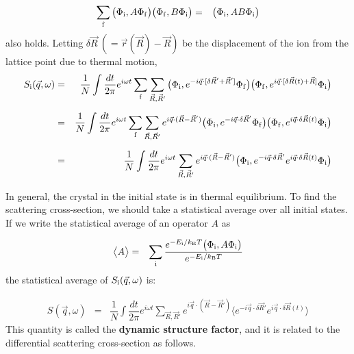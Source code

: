 \documentclass[a4j]{jsarticle}
\begin{document}
\begin{eqnarray}
	\sum_{\rm f}
	\big( \Phi_{\rm i} , A \Phi_{\rm f} \big)
	\big( \Phi_{\rm f} , B \Phi_{\rm i} \big)
	&=&
	\big( \Phi_{\rm i} , AB \Phi_{\rm i} \big)
\end{eqnarray}
also holds.
Letting $\delta \vec{R} \ (= \vec{r}(\vec{R}) - \vec{R} )$ be the displacement of the ion from the lattice point due to thermal motion,
\begin{eqnarray}
	S_{\rm i}(\vec{q},\omega)
	&=&
	\dfrac{1}{N}
	\int \dfrac{ dt }{ 2 \pi }
	e^{ i \omega t }
	\sum_{\rm f}
	\sum_{\vec{R},\vec{R}'}
	\big( \Phi_{\rm i} , e^{ - i \vec{q} \cdot [ \delta \vec{R}' + \vec{R}' ]  } \Phi_{\rm f} \big)
	\big( \Phi_{\rm f} , e^{i \vec{q} \cdot [ \delta \vec{R}(t) + \vec{R} ] } \Phi_{\rm i} \big)
	\nonumber \\[2mm] &=&
	\dfrac{1}{N}
	\int \dfrac{ dt }{ 2 \pi }
	e^{ i \omega t }
	\sum_{\rm f}
	\sum_{\vec{R},\vec{R}'}
	e^{ i \vec{q} \cdot (\vec{R} - \vec{R}')}
	\big( \Phi_{\rm i} , e^{ - i \vec{q} \cdot \delta \vec{R}' } \Phi_{\rm f} \big)
	\big( \Phi_{\rm f} , e^{i \vec{q} \cdot \delta \vec{R}(t) } \Phi_{\rm i} \big)
	\nonumber \\[2mm] &=&
	\dfrac{1}{N}
	\int \dfrac{ dt }{ 2 \pi }
	e^{ i \omega t }
	\sum_{\vec{R},\vec{R}'}
	e^{ i \vec{q} \cdot (\vec{R} - \vec{R}')}
	\big( \Phi_{\rm i} , e^{ - i \vec{q} \cdot \delta \vec{R}' } e^{i \vec{q} \cdot \delta \vec{R}(t) } \Phi_{\rm i} \big)
\end{eqnarray}

In general, the crystal in the initial state is in thermal equilibrium.
To find the scattering cross-section, we should take a statistical average over all initial states.
If we write the statistical average of an operator $A$ as

\begin{eqnarray}
	\big\langle A \big\rangle
	&=&
	\sum_{\rm i}
	\dfrac{ e^{ - E_{\rm i} / k_{\rm B} T } \big( \Phi_{\rm i} , A \Phi_{\rm i} \big) }{e^{ - E_{\rm i} / k_{\rm B} T }}
\end{eqnarray}
the statistical average of $S_{\rm i}(\vec{q},\omega)$ is:

\begin{eqnarray}
	S(\vec{q},\omega)
	&=&
	\dfrac{1}{N}
	\int \dfrac{ dt }{ 2 \pi }
	e^{ i \omega t }
	\sum_{\vec{R},\vec{R}'}
	e^{ i \vec{q} \cdot (\vec{R} - \vec{R}')}
	\big\langle e^{ - i \vec{q} \cdot \delta \vec{R}' } e^{i \vec{q} \cdot \delta \vec{R}(t) } \big\rangle
\end{eqnarray}
This quantity is called the \textbf{dynamic structure factor},
and it is related to the differential scattering cross-section as follows.
\end{document}
